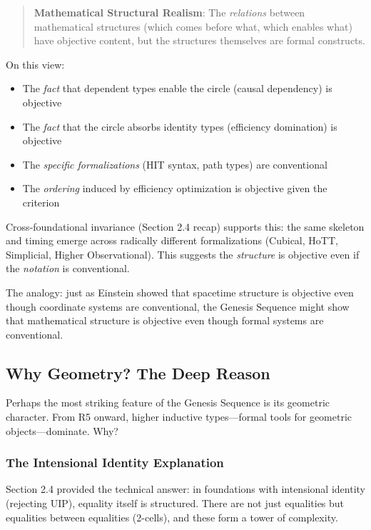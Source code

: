 \documentclass[11pt]{article}
\theoremstyle{definition}
\begin{document}
\begin{quote}
\textbf{Mathematical Structural Realism}: The \emph{relations} between mathematical structures (which comes before what, which enables what) have objective content, but the structures themselves are formal constructs.
\end{quote}

On this view:
\begin{itemize}
\item The \emph{fact} that dependent types enable the circle (causal dependency) is objective
\item The \emph{fact} that the circle absorbs identity types (efficiency domination) is objective
\item The \emph{specific formalizations} (HIT syntax, path types) are conventional
\item The \emph{ordering} induced by efficiency optimization is objective given the criterion
\end{itemize}

Cross-foundational invariance (Section 2.4 recap) supports this: the same skeleton and timing emerge across radically different formalizations (Cubical, HoTT, Simplicial, Higher Observational). This suggests the \emph{structure} is objective even if the \emph{notation} is conventional.

The analogy: just as Einstein showed that spacetime structure is objective even though coordinate systems are conventional, the Genesis Sequence might show that mathematical structure is objective even though formal systems are conventional.

\subsection{Why Geometry? The Deep Reason}

Perhaps the most striking feature of the Genesis Sequence is its geometric character. From R5 onward, higher inductive types—formal tools for geometric objects—dominate. Why?

\subsubsection{The Intensional Identity Explanation}

Section 2.4 provided the technical answer: in foundations with intensional identity (rejecting UIP), equality itself is structured. There are not just equalities but equalities between equalities (2-cells), and these form a tower of complexity.
\end{document}
